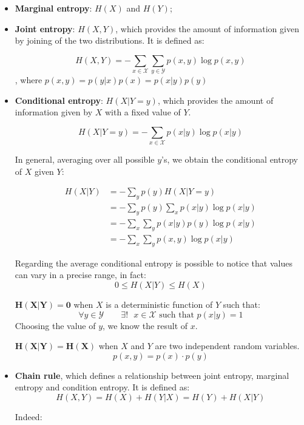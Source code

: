 \begin{itemize}
    \item \textbf{Marginal entropy}: $H(X)$ and $H(Y)$;
    \item \textbf{Joint entropy}: $H(X, Y)$, which provides the amount of information given by joining of the two distributions. It is defined as:
    
    $$
    H(X,Y) = -\sum_{x \in \mathcal{X}} \sum_{y \in \mathcal{Y}} p(x,y) \log p(x,y)
    $$ 
    , where $p(x,y) = p(y|x) p(x) = p(x|y) p(y) $
    
    \item \textbf{Conditional entropy}: $H(X|Y = y)$, which provides the amount of information given by $X$ with a fixed value of $Y$.

    $$
    H(X|Y = y) = - \sum_{x \in \mathcal{X}} p(x|y) \log p(x|y)
    $$

    In general, averaging over all possible $y$'s, we obtain the conditional entropy of $X$ given $Y$:
    
    \begin{equation*}
    \begin{split}
	H(X|Y) &= - \sum_y p(y) H(X|Y=y)\\
        &= - \sum_y p(y) \sum_x p(x|y) \log p(x|y) \\
	&= - \sum_x \sum_y p(x|y) p(y) \log p(x|y)\\
	&= - \sum_x \sum_y p(x,y) \log p(x|y)		
    \end{split}
    \end{equation*}
    
	Regarding the average conditional entropy is possible to notice that values can vary in a precise range, in fact:
	$$0 \leq H(X|Y) \leq H(X)$$
	
	$\mathbf{H(X|Y) = 0}$ when $X$ is a deterministic function of $Y$ such that:
	$$\forall y \in \mathcal{Y} \qquad \exists!\text{ }x \in \mathcal{X} \text{ such that } p(x|y) = 1$$
	Choosing the value of $y$, we know the result of $x$. 
	
	$\mathbf{H(X|Y) = H(X)}$ when $X$ and $Y$ are two independent random variables.
	$$p(x,y) = p(x)\cdot p(y)$$

	\item \textbf{Chain rule}, which defines a relationship between joint entropy, marginal entropy and condition entropy. It is defined as:
	$$H(X,Y) = H(X) + H(Y|X) = H(Y) + H(X|Y)$$
	
	Indeed:


\end{itemize}
